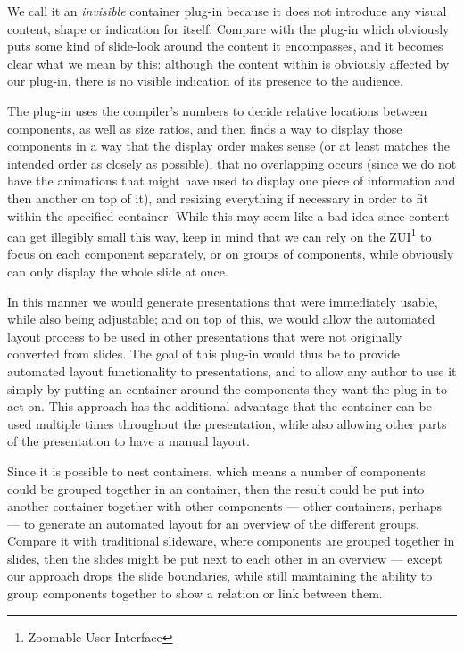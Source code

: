     We call it an \emph{invisible} container plug-in because it does not
    introduce any visual content, shape or indication for itself. Compare with
    the  plug-in which obviously puts some kind of slide-look
    around the content it encompasses, and it becomes clear what we mean by
    this: although the content within is obviously affected by our plug-in,
    there is no visible indication of its presence to the audience.

    The plug-in uses the compiler's numbers to decide relative locations
    between components, as well as size ratios, and then finds a way to display
    those components in a way that the display order makes sense (or at least
    matches the intended order as closely as possible), that no overlapping
    occurs (since we do not have the animations that \ppt might have used to
    display one piece of information and then another on top of it), and
    resizing everything if necessary in order to fit within the specified
    container. While this may seem like a bad idea since content can get
    illegibly small this way, keep in mind that we can rely on the
    ZUI\footnote{Zoomable User Interface} to focus on each component
    separately, or on groups of components, while \ppt obviously can only
    display the whole slide at once.

    In this manner we would generate \mxp presentations that were immediately
    usable, while also being adjustable; and on top of this, we would allow the
    automated layout process to be used in other \mxp presentations that were
    not originally converted from \ppt slides. The goal of this plug-in would
    thus be to provide automated layout functionality to \mxp presentations,
    and to allow any \mxp author to use it simply by putting an
     container around the components they want
    the plug-in to act on. This approach has the additional advantage that the
    container can be used multiple times throughout the presentation, while
    also allowing other parts of the presentation to have a manual layout.
  
    Since it is possible to nest containers, which means a number of components
    could be grouped together in an  container, then the
    result could be put into another  container together with
    other components --- other  containers, perhaps --- to
    generate an automated layout for an overview of the different groups.
    Compare it with traditional slideware, where components are grouped
    together in slides, then the slides might be put next to each other in an
    overview --- except our approach drops the slide boundaries, while still
    maintaining the ability to group components together to show a relation or
    link between them.


